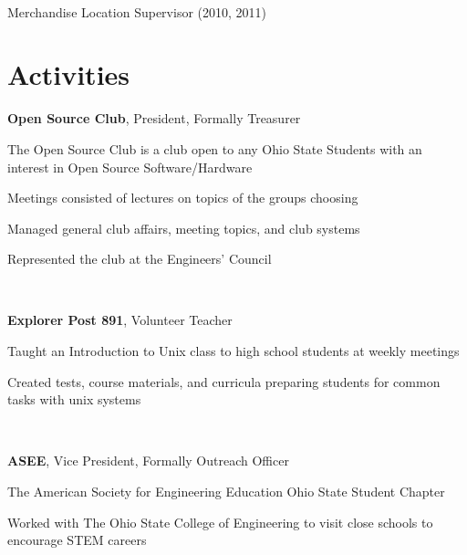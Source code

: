 \documentclass[letterpaper]{resume}
\begin{document}
~

Merchandise Location Supervisor (2010, 2011)

%

\section{Activities}

\textbf{Open Source Club}, President, Formally Treasurer
\begin{compactitem}
\item The Open Source Club is a club open to any Ohio State Students with an interest in Open Source Software/Hardware
\item Meetings consisted of lectures on topics of the groups choosing
\item Managed general club affairs, meeting topics, and club systems
\item Represented the club at the Engineers' Council
\end{compactitem}

~

\textbf{Explorer Post 891}, Volunteer Teacher
\begin{compactitem}
\item Taught an Introduction to Unix class to high school students at
	weekly meetings
\item Created tests, course materials, and curricula preparing students
	for common tasks with unix systems
\end{compactitem}

~

\textbf{ASEE}, Vice President, Formally Outreach Officer
\begin{compactitem}
\item The American Society for Engineering Education Ohio State Student Chapter
\item Worked with The Ohio State College of Engineering to visit close schools to encourage STEM careers
\end{compactitem}
\end{document}

